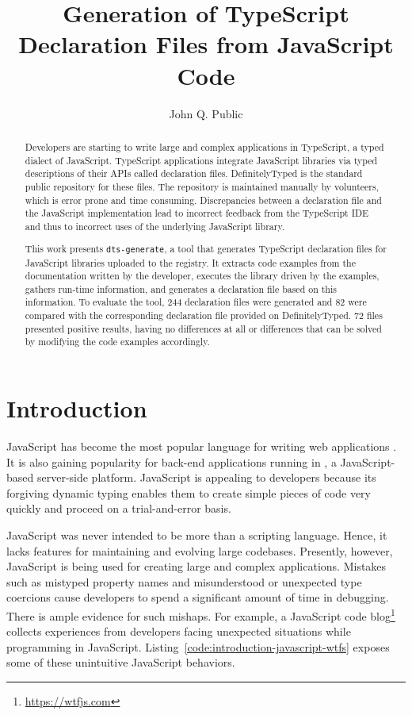 \documentclass[a4paper,english,cleveref, autoref]{lipics-v2019}
\title{Generation of TypeScript Declaration Files from JavaScript Code}
\author{John Q. Public}{Dummy University Computing Laboratory, Country \and My second affiliation, Country \and \url{http://www.myhomepage.edu} }{johnqpublic@dummyuni.org}{https://orcid.org/0000-0002-1825-0097}{(Optional) author-specific funding acknowledgements}%
\newcommand{\coderef}[1]{Listing~\ref{#1}}
\begin{document}
\maketitle

\begin{abstract}
Developers are starting to write large and complex applications in
TypeScript, a typed dialect of JavaScript. TypeScript applications
integrate JavaScript libraries via typed descriptions of their APIs
called declaration files. DefinitelyTyped is the standard public
repository for these files.
The repository is maintained manually by volunteers, which
is error prone and time consuming. Discrepancies between a
declaration file and the JavaScript implementation lead to
incorrect feedback from the TypeScript IDE and thus to incorrect uses
of the underlying JavaScript library.

This work presents \texttt{dts-generate}, a tool that generates
TypeScript declaration files for JavaScript libraries uploaded to the \NPM{}
registry. It extracts code examples from the documentation written by
the developer, executes the library driven by the examples, gathers
run-time information, and generates a declaration file based on this
information. To evaluate the tool, 244 declaration files were generated and 82 were
compared with the corresponding declaration file provided on DefinitelyTyped. 72 files presented positive results, having no differences at all or differences that can be solved by modifying the code examples accordingly.

\end{abstract}

\section{Introduction}
\label{sec:introduction}
JavaScript has become the most popular language for writing web
applications \cite{github-statistics}. It is also gaining popularity
for back-end applications running in \NodeJS{}, a JavaScript-based
server-side platform. JavaScript is appealing to developers because
its forgiving dynamic typing enables 
them to create simple pieces of code very quickly and proceed on a
trial-and-error basis.

JavaScript was never intended to be more than a
scripting language. Hence, it lacks features for maintaining and evolving large
codebases.
Presently, however, JavaScript is being used for creating large and complex
applications. 
Mistakes such as mistyped property
names and misunderstood or unexpected type coercions cause developers
to spend a significant amount of time in debugging. There is ample
evidence for such mishaps. For example, a 
JavaScript code blog\footnote{\url{https://wtfjs.com}} collects experiences
from developers facing unexpected situations while programming in
JavaScript. \coderef{code:introduction-javascript-wtfs} exposes some
of these unintuitive JavaScript behaviors. 
\end{document}
